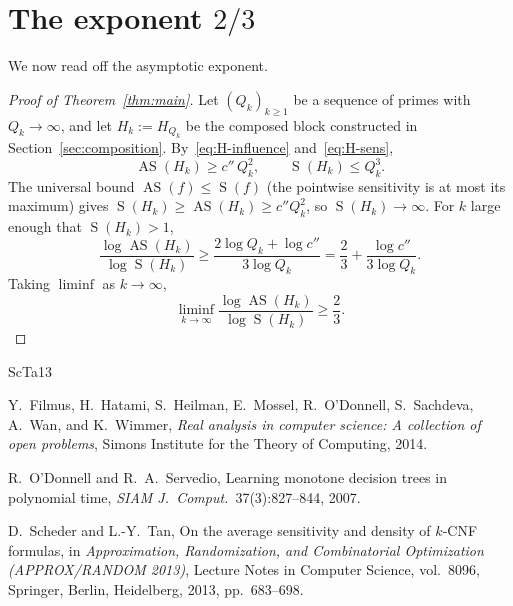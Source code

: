 \documentclass[11pt]{article}
\newcommand{\AS}{\operatorname{AS}}
\newcommand{\sens}{\operatorname{S}}
\begin{document}
\section{The exponent \(2/3\)}\label{sec:limit}

We now read off the asymptotic exponent.

\begin{proof}[Proof of Theorem~\ref{thm:main}]
Let \((Q_k)_{k\ge 1}\) be a sequence of primes with \(Q_k\to\infty\), and let \(H_k:=H_{Q_k}\) be the composed block constructed in Section~\ref{sec:composition}. By~\eqref{eq:H-influence} and~\eqref{eq:H-sens},
\[
    \AS(H_k)\ge c''\,Q_k^{2},
    \qquad
    \sens(H_k)\le Q_k^{3}.
\]
The universal bound \(\AS(f)\le \sens(f)\) (the pointwise sensitivity is at most its maximum) gives \(\sens(H_k)\ge \AS(H_k)\ge c''Q_k^2\), so \(\sens(H_k)\to\infty\). For \(k\) large enough that \(\sens(H_k)>1\),
\[
    \frac{\log\AS(H_k)}{\log\sens(H_k)}
    \ge
    \frac{2\log Q_k+\log c''}{3\log Q_k}
    =
    \frac{2}{3}+\frac{\log c''}{3\log Q_k}.
\]
Taking \(\liminf\) as \(k\to\infty\),
\[
    \liminf_{k\to\infty}\frac{\log\AS(H_k)}{\log\sens(H_k)}\ge \frac{2}{3}.
\]
\end{proof}

\begin{thebibliography}{ScTa13}

Y.~Filmus, H.~Hatami, S.~Heilman, E.~Mossel, R.~O'Donnell, S.~Sachdeva, A.~Wan, and K.~Wimmer,
\emph{Real analysis in computer science: A collection of open problems},
Simons Institute for the Theory of Computing, 2014.

R.~O'Donnell and R.~A.~Servedio,
Learning monotone decision trees in polynomial time,
\emph{SIAM J.~Comput.}\ 37(3):827--844, 2007.

D.~Scheder and L.-Y.~Tan,
On the average sensitivity and density of \(k\)-CNF formulas,
in \emph{Approximation, Randomization, and Combinatorial Optimization (APPROX/RANDOM 2013)},
Lecture Notes in Computer Science, vol.\ 8096, Springer, Berlin, Heidelberg, 2013, pp.\ 683--698.

\end{thebibliography}
\end{document}
